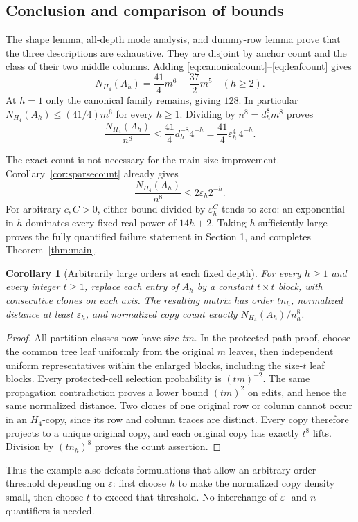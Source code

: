 \documentclass[11pt,a4paper]{article}
\newtheorem{corollary}[theorem]{Corollary}
\theoremstyle{remark}
\newcommand{\eps}{\varepsilon}
\newcommand{\Hfour}{H_4}
\begin{document}
\subsection{Conclusion and comparison of bounds}
The shape lemma, all-depth mode analysis, and dummy-row lemma prove
that the three descriptions are exhaustive. They are disjoint by
anchor count and the class of their two middle columns.
Adding \eqref{eq:canonicalcount}--\eqref{eq:leafcount} gives
\[
N_{\Hfour}(A_h)=\frac{41}{4}m^6-\frac{37}{2}m^5
\quad(h\ge2).
\]
At \(h=1\) only the canonical family remains, giving \(128\).
In particular \(N_{\Hfour}(A_h)\le(41/4)m^6\) for every \(h\ge1\).
Dividing by \(n^8=d_h^8m^8\) proves
\[
\frac{N_{\Hfour}(A_h)}{n^8}
\le\frac{41}{4}d_h^{-8}4^{-h}
=\frac{41}{4}\eps_h^4\,4^{-h}.
\]

The exact count is not necessary for the main size improvement.
Corollary~\ref{cor:sparsecount} already gives
\[
\frac{N_{\Hfour}(A_h)}{n^8}\le2\eps_h2^{-h}.
\]
For arbitrary \(c,C>0\), either bound divided by \(\eps_h^C\)
tends to zero: an exponential in \(h\) dominates every fixed
real power of \(14h+2\). Taking \(h\) sufficiently large proves
the fully quantified failure statement in Section 1, and completes
Theorem~\ref{thm:main}.

\begin{corollary}[Arbitrarily large orders at each fixed depth]
For every \(h\ge1\) and every integer \(t\ge1\), replace each entry
of \(A_h\) by a constant \(t\times t\) block, with consecutive
clones on each axis. The resulting matrix has order \(tn_h\),
normalized distance at least \(\eps_h\), and normalized copy
count exactly \(N_{\Hfour}(A_h)/n_h^8\).
\end{corollary}
\begin{proof}
All partition classes now have size \(tm\). In the protected-path
proof, choose the common tree leaf uniformly from the original
\(m\) leaves, then independent uniform representatives within
the enlarged blocks, including the size-\(t\) leaf blocks.
Every protected-cell selection probability is \((tm)^{-2}\).
The same propagation contradiction proves a lower bound
\((tm)^2\) on edits, and hence the same normalized distance.
Two clones of one original row or column cannot occur in an
\(\Hfour\)-copy, since its row and column traces are distinct.
Every copy therefore projects to a unique original copy, and
each original copy has exactly \(t^8\) lifts. Division by
\((tn_h)^8\) proves the count assertion.
\end{proof}
Thus the example also defeats formulations that allow an arbitrary
order threshold depending on \(\eps\): first choose \(h\) to make
the normalized copy density small, then choose \(t\) to exceed that
threshold. No interchange of \(\eps\)- and \(n\)-quantifiers is needed.
\end{document}
